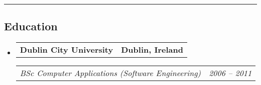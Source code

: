 \documentclass[11pt,letterpaper]{article}
\makeatletter
\newcommand{\headerrow}[2]
{\begin{tabular*}{\linewidth}{l@{\extracolsep{\fill}}r}
#1 &
#2 \\
\end{tabular*}}
\makeatother
\begin{document}
\hrule
\vspace{-1em}
\subsection*{\Large Education}

\begin{itemize}[leftmargin=1em]
	\parskip=0.1em
		
	\item
	      \headerrow
	      {\textbf{Dublin City University}}
	      {\textbf{Dublin, Ireland}}
	      \headerrow
	      {\emph{BSc Computer Applications (Software Engineering)}}
	      {\emph{2006 -- 2011 }}

	      	      
\end{itemize}
\end{document}
